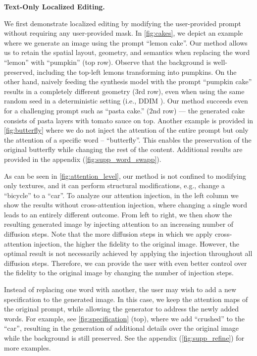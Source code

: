 \textbf{Text-Only Localized Editing.}

We first demonstrate localized editing by modifying the user-provided prompt without requiring any user-provided mask. In \ref{fig:cakes}, we depict an example where we generate an image using the prompt ``lemon cake''. Our method allows us to retain the spatial layout, geometry, and semantics when replacing the word ``lemon'' with ``pumpkin'' (top row). Observe that the background is well-preserved, including the top-left lemons transforming into pumpkins. On the other hand, naively feeding the synthesis model with the prompt ``pumpkin cake'' results in a completely different geometry ($3$rd row), even when using the same random seed in a deterministic setting (i.e., DDIM \cite{song2020denoising}). Our method succeeds even for a challenging prompt such as ``pasta cake.'' ($2$nd row) --- the generated cake consists of pasta layers with tomato sauce on top. Another example is provided in \ref{fig:butterfly} where we do not inject the attention of the entire prompt but only the attention of a specific word -- ``butterfly''. This enables the preservation of the original butterfly while changing the rest of the content. Additional results are provided in the appendix (\ref{fig:supp_word_swapp}).

As can be seen in \ref{fig:attention_level}, our method is not confined to modifying only textures, and it can perform structural modifications, e.g., change a ``bicycle'' to a ``car''. To analyze our attention injection, in the left column we show the results without cross-attention injection, where changing a single word leads to an entirely different outcome. From left to right, we then show the resulting generated image by injecting attention to an increasing number of diffusion steps. Note that the more diffusion steps in which we apply cross-attention injection, the higher the fidelity to the original image. However, the optimal result is not necessarily achieved by applying the injection throughout all diffusion steps. Therefore, we can provide the user with even better control over the fidelity to the original image by changing the number of injection steps.

Instead of replacing one word with another, the user may wish to add a new specification to the generated image. In this case, we keep the attention maps of the original prompt, while allowing the generator to address the newly added words. For example, see \ref{fig:specification} (top), where we add ``crushed'' to the ``car'', resulting in the generation of additional details over the original image while the background is still preserved. See the appendix (\ref{fig:supp_refine}) for more examples.

